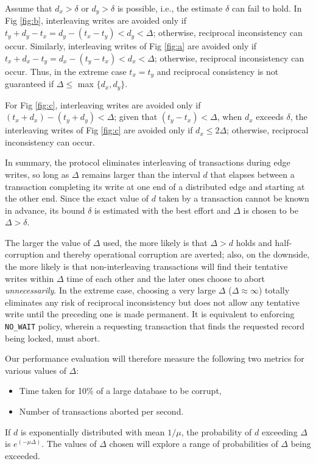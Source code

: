 Assume that $d_x > \delta$ or $d_y > \delta$ is possible, i.e., the estimate $\delta$ can fail to hold.
In Fig \ref{fig:b}, interleaving  writes are avoided only if $t_y + d_y - t_x = d_y - (t_x-t_y) < d_y < \Delta$; otherwise, reciprocal inconsistency can occur.
Similarly, interleaving  writes of Fig \ref{fig:a} are avoided only if $t_x + d_x - t_y = d_x - (t_y-t_x) < d_x < \Delta$; otherwise, reciprocal inconsistency can occur.
Thus, in the extreme case $t_x = t_y$ and reciprocal consistency is not guaranteed if $\Delta \leq $ max $\{d_x , d_y \}$.

For Fig \ref{fig:c}, interleaving  writes are avoided only if $(t_x + d_x) - (t_y + d_y)  < \Delta$; given that $(t_y - t_x) < \Delta$, when $d_x$ exceeds $ \delta$, the interleaving writes of Fig \ref{fig:c} are avoided only if $d_x \leq 2 \Delta$; otherwise, reciprocal inconsistency can occur.

In summary, the \tDelta protocol eliminates interleaving of transactions during edge writes, so long as $\Delta$ remains larger than the interval $d$ that elapses between a transaction completing its write at one end of a distributed edge and starting at the other end.
Since the exact value of $d$ taken by a transaction cannot be known in advance, its bound $\delta$ is estimated with the best effort and $\Delta$ is chosen to be $\Delta > \delta$.

The larger the value of $\Delta$ used, the more likely is that $\Delta > d$ holds and half-corruption and thereby operational corruption are averted; also, on the downside, the more likely is that non-interleaving transactions will find their tentative writes within $\Delta$ time of each other and the later ones choose to abort \emph{unnecessarily}.
In the extreme case, choosing a very large $\Delta$ ($\Delta \approx \infty $) totally eliminates any risk of reciprocal inconsistency but does not allow any tentative write until the preceding one is made permanent. It is equivalent to enforcing \texttt{NO_WAIT} policy, wherein a requesting transaction that finds the requested record being locked, must abort.

Our performance evaluation will therefore  measure the following two metrics for various values of $\Delta$:
\begin{itemize}
\item Time taken for 10\% of a large database to be corrupt,
\item Number of transactions aborted per second.
\end{itemize}
If $d$ is exponentially distributed with mean $1/ \mu$, the probability of $d$ exceeding $\Delta$ is $ e^{(-\mu \Delta)}$. The values of $\Delta$ chosen will explore a range of probabilities of $\Delta$ being exceeded.
